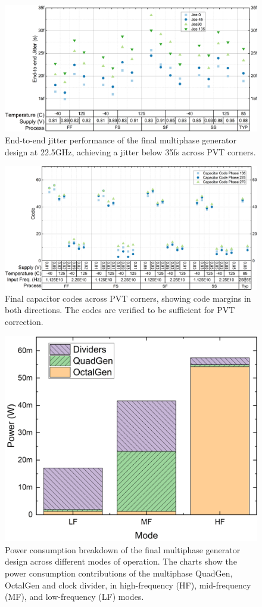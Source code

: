 \begin{figure}[H]
  \centering
  \includegraphics[width=0.8\linewidth]{figures/Results/Final_HF_LF_MF-Pivot_Jee.png}
  \caption{End-to-end jitter performance of the final multiphase generator design at 22.5GHz, achieving a jitter below 35fs across PVT corners.}
  \label{fig:final_jitter}
\end{figure}

\begin{figure}[H]
  \centering
  \includegraphics[width=0.8\linewidth]{figures/Results/Final_HF_LF_MF-Pivot_CapCodes_HF.png}
  \caption{Final capacitor codes across PVT corners, showing code margins in both directions. The codes are verified to be sufficient for PVT correction.}
  \label{fig:final_codes}
\end{figure}

\begin{figure}[H]
  \centering
  \includegraphics[width=0.8\linewidth]{figures/Results/Final_HF_LF_MF-power_distributions_LFMFHF.png}
  \caption{Power consumption breakdown of the final multiphase generator design across different modes of operation. The charts show the power consumption contributions of the multiphase QuadGen, OctalGen and clock divider, in high-frequency (HF), mid-frequency (MF), and low-frequency (LF) modes.}
  \label{fig:power_consumption}
\end{figure}

